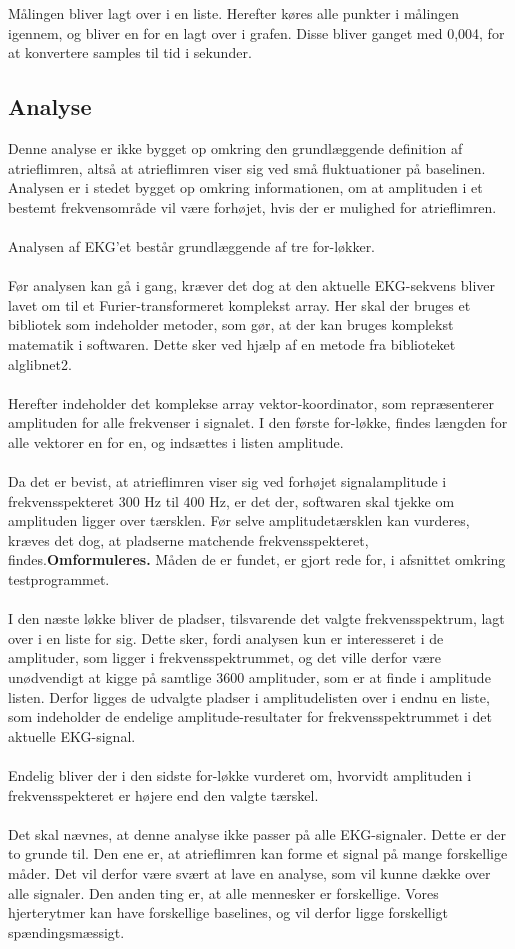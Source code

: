 Målingen bliver lagt over i en liste. Herefter køres alle punkter i målingen igennem, og bliver en for en lagt over i grafen. Disse bliver ganget med 0,004, for at konvertere samples til tid i sekunder. 


\subsection{Analyse}
Denne analyse er ikke bygget op omkring den grundlæggende definition af atrieflimren, altså at atrieflimren viser sig ved små fluktuationer på baselinen. Analysen er i stedet bygget op omkring informationen, om at amplituden i et bestemt frekvensområde vil være forhøjet, hvis der er mulighed for atrieflimren. \\ \\
Analysen af EKG’et består grundlæggende af tre for-løkker. \\ \\
Før analysen kan gå i gang, kræver det dog at den aktuelle EKG-sekvens bliver lavet om til et Furier-transformeret komplekst array. Her skal der bruges et bibliotek som indeholder metoder, som gør, at der kan bruges komplekst matematik i softwaren. Dette sker ved hjælp af en metode fra biblioteket alglibnet2. \\ \\
Herefter indeholder det komplekse array vektor-koordinator, som repræsenterer amplituden for alle frekvenser i signalet. I den første for-løkke, findes længden for alle vektorer en for en, og indsættes i listen amplitude. \\ \\
Da det er bevist, at atrieflimren viser sig ved forhøjet signalamplitude i frekvensspekteret 300 Hz til 400 Hz, er det der, softwaren skal tjekke om amplituden ligger over tærsklen. Før selve amplitudetærsklen kan vurderes, kræves det dog, at pladserne matchende frekvensspekteret, findes.\textbf{Omformuleres.} Måden de er fundet, er gjort rede for, i afsnittet omkring testprogrammet. \\ \\
I den næste løkke bliver de pladser, tilsvarende det valgte frekvensspektrum, lagt over i en liste for sig. Dette sker, fordi analysen kun er interesseret i de amplituder, som ligger i frekvensspektrummet, og det ville derfor være unødvendigt at kigge på samtlige 3600 amplituder, som er at finde i amplitude listen. Derfor ligges de udvalgte pladser i amplitudelisten over i endnu en liste, som indeholder de endelige amplitude-resultater for frekvensspektrummet i det aktuelle EKG-signal. \\ \\
Endelig bliver der i den sidste for-løkke vurderet om, hvorvidt amplituden i frekvensspekteret er højere end den valgte tærskel. \\ \\
Det skal nævnes, at denne analyse ikke passer på alle EKG-signaler. Dette er der to grunde til. Den ene er, at atrieflimren kan forme et signal på mange forskellige måder. Det vil derfor være svært at lave en analyse, som vil kunne dække over alle signaler. Den anden ting er, at alle mennesker er forskellige. Vores hjerterytmer kan have forskellige baselines, og vil derfor ligge forskelligt spændingsmæssigt. 

